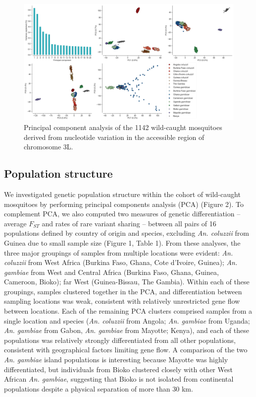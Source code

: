\documentclass[a4paper,11pt,abstracton,hidelinks]{scrartcl}
\begin{document}
\begin{figure}[H]
	\begin{center}
		\includegraphics*[width=6.3in]{artwork/main_pca.jpeg}
	\end{center}
	\caption{Principal component analysis of the 1142 wild-caught mosquitoes derived from nucleotide variation in the accessible region of chromosome 3L.}
	\label{pca}
\end{figure}


\subsection*{Population structure}


%
We investigated genetic population structure within the cohort of wild-caught mosquitoes by performing principal components analysis (PCA) (Figure 2).
%
To complement PCA, we also computed two measures of genetic differentiation -- average $F_{ST}$ and rates of rare variant sharing -- between all pairs of 16 populations defined by country of origin and species, excluding \textit{An. coluzzii} from Guinea due to small sample size (Figure 1, Table 1).
%
From these analyses, the three major groupings of samples from multiple locations were evident: \textit{An. coluzzii} from West Africa (Burkina Faso, Ghana, Cote d'Ivoire, Guinea); \textit{An. gambiae} from West and Central Africa (Burkina Faso, Ghana, Guinea, Cameroon, Bioko); far West (Guinea-Bissau, The Gambia). 
%
Within each of these groupings, samples clustered together in the PCA, and differentiation between sampling locations was weak, consistent with relatively unrestricted gene flow between locations.
%
Each of the remaining PCA clusters comprised samples from a single location and species (\textit{An. coluzzii} from Angola; \textit{An. gambiae} from Uganda; \textit{An. gambiae} from Gabon, \textit{An. gambiae} from Mayotte; Kenya), and each of these populations was relatively strongly differentiated from all other populations, consistent with geographical factors limiting gene flow.
%
A comparison of the two \textit{An. gambiae} island populations is interesting because Mayotte was highly differentiated, but individuals from Bioko clustered closely with other West African \textit{An. gambiae}, suggesting that Bioko is not isolated from continental populations despite a physical separation of more than 30 km.
\end{document}
